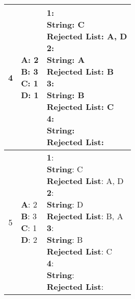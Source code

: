 \documentclass{article}
\begin{document}
\begin{center}
\begin{longtable}{ c|l|l }
        4 & \makecell{\textbf{A}: 2 \\ \textbf{B}: 3 \\ \textbf{C}: 1 \\ \textbf{D}: 1} &  
        \makecell{\textbf{1}:\\ \hspace{10mm} \textbf{String}: C \\ \hspace{10mm} \textbf{Rejected List}: A, D \\
                    \textbf{2}:\\ \hspace{10mm} \textbf{String}: A \\ \hspace{10mm} \textbf{Rejected List}: B \\
                    \textbf{3}:\\ \hspace{10mm} \textbf{String}: B \\ \hspace{10mm} \textbf{Rejected List}: C\\
                    \textbf{4}:\\ \hspace{10mm} \textbf{String}:  \\ \hspace{10mm} \textbf{Rejected List}: \\} \\
        \hline 

        5 & \makecell{\textbf{A}: 2 \\ \textbf{B}: 3 \\ \textbf{C}: 1 \\ \textbf{D}: 2} &  
        \makecell{\textbf{1}:\\ \hspace{10mm} \textbf{String}: C \\ \hspace{10mm} \textbf{Rejected List}: A, D \\
                    \textbf{2}:\\ \hspace{10mm} \textbf{String}: D \\ \hspace{10mm} \textbf{Rejected List}: B, A \\
                    \textbf{3}:\\ \hspace{10mm} \textbf{String}: B \\ \hspace{10mm} \textbf{Rejected List}: C\\
                    \textbf{4}:\\ \hspace{10mm} \textbf{String}:  \\ \hspace{10mm} \textbf{Rejected List}: \\} \\
        \hline 


\end{longtable}
\end{center}
\end{document}

